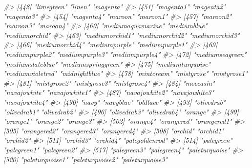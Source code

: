 \documentclass[
]{book}
\newenvironment{Shaded}{\begin{snugshade}}{\end{snugshade}}
\newcommand{\CommentTok}[1]{\textcolor[rgb]{0.56,0.35,0.01}{\textit{#1}}}
\begin{document}
\begin{Shaded}
\begin{Highlighting}[]
\CommentTok{\#\textgreater{} [448] "limegreen"            "linen"                "magenta"             }
\CommentTok{\#\textgreater{} [451] "magenta1"             "magenta2"             "magenta3"            }
\CommentTok{\#\textgreater{} [454] "magenta4"             "maroon"               "maroon1"             }
\CommentTok{\#\textgreater{} [457] "maroon2"              "maroon3"              "maroon4"             }
\CommentTok{\#\textgreater{} [460] "mediumaquamarine"     "mediumblue"           "mediumorchid"        }
\CommentTok{\#\textgreater{} [463] "mediumorchid1"        "mediumorchid2"        "mediumorchid3"       }
\CommentTok{\#\textgreater{} [466] "mediumorchid4"        "mediumpurple"         "mediumpurple1"       }
\CommentTok{\#\textgreater{} [469] "mediumpurple2"        "mediumpurple3"        "mediumpurple4"       }
\CommentTok{\#\textgreater{} [472] "mediumseagreen"       "mediumslateblue"      "mediumspringgreen"   }
\CommentTok{\#\textgreater{} [475] "mediumturquoise"      "mediumvioletred"      "midnightblue"        }
\CommentTok{\#\textgreater{} [478] "mintcream"            "mistyrose"            "mistyrose1"          }
\CommentTok{\#\textgreater{} [481] "mistyrose2"           "mistyrose3"           "mistyrose4"          }
\CommentTok{\#\textgreater{} [484] "moccasin"             "navajowhite"          "navajowhite1"        }
\CommentTok{\#\textgreater{} [487] "navajowhite2"         "navajowhite3"         "navajowhite4"        }
\CommentTok{\#\textgreater{} [490] "navy"                 "navyblue"             "oldlace"             }
\CommentTok{\#\textgreater{} [493] "olivedrab"            "olivedrab1"           "olivedrab2"          }
\CommentTok{\#\textgreater{} [496] "olivedrab3"           "olivedrab4"           "orange"              }
\CommentTok{\#\textgreater{} [499] "orange1"              "orange2"              "orange3"             }
\CommentTok{\#\textgreater{} [502] "orange4"              "orangered"            "orangered1"          }
\CommentTok{\#\textgreater{} [505] "orangered2"           "orangered3"           "orangered4"          }
\CommentTok{\#\textgreater{} [508] "orchid"               "orchid1"              "orchid2"             }
\CommentTok{\#\textgreater{} [511] "orchid3"              "orchid4"              "palegoldenrod"       }
\CommentTok{\#\textgreater{} [514] "palegreen"            "palegreen1"           "palegreen2"          }
\CommentTok{\#\textgreater{} [517] "palegreen3"           "palegreen4"           "paleturquoise"       }
\CommentTok{\#\textgreater{} [520] "paleturquoise1"       "paleturquoise2"       "paleturquoise3"      }

\end{Highlighting}
\end{Shaded}
\end{document}
